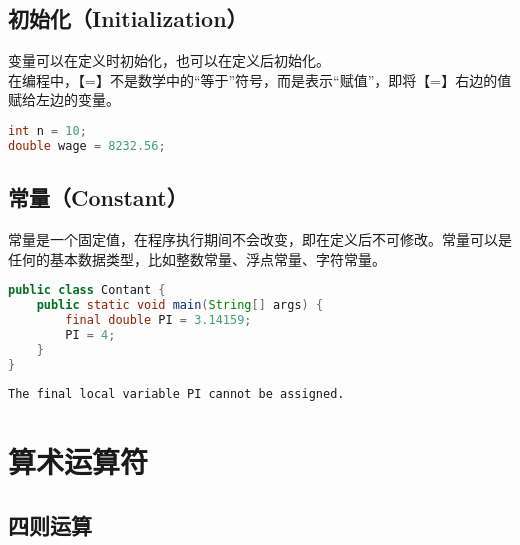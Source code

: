 \subsection{初始化（Initialization）}

变量可以在定义时初始化，也可以在定义后初始化。 \\

在编程中，【=】不是数学中的“等于”符号，而是表示“赋值”，即将【=】右边的值赋给左边的变量。

\vspace{-0.5cm}

\begin{lstlisting}[language=Java]
int n = 10;
double wage = 8232.56;
\end{lstlisting}

\subsection{常量（Constant）}

常量是一个固定值，在程序执行期间不会改变，即在定义后不可修改。常量可以是任何的基本数据类型，比如整数常量、浮点常量、字符常量。 \\


\begin{lstlisting}[language=Java]
public class Contant {
    public static void main(String[] args) {
        final double PI = 3.14159;
        PI = 4;
    }
}
\end{lstlisting}

\begin{tcolorbox}
	\begin{verbatim}
The final local variable PI cannot be assigned.
	\end{verbatim}
\end{tcolorbox}

\section{算术运算符}

\subsection{四则运算}

\begin{table}[H]
	\centering
	\caption{四则运算}
\end{table}

